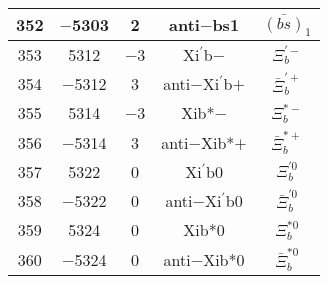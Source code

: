 \documentclass{article}
\begin{document}
\begin{table}[!htbp]
\begin{tabular}{|c|c|c|c|c|}
\hline
352 & $-$5303 & 2 & anti$-$bs\underline{\hspace{0.6em}}1 & $\bar{(bs)}_{1}$ \\
\hline
353 & 5312 & $-$3 & Xi$^{\prime}$\underline{\hspace{0.6em}}b$-$ & $\Xi_{b}^{\prime-}$ \\
\hline
354 & $-$5312 & 3 & anti$-$Xi$^{\prime}$\underline{\hspace{0.6em}}b$+$ & $\bar{\Xi}_{b}^{\prime+}$ \\
\hline
355 & 5314 & $-$3 & Xi\underline{\hspace{0.6em}}b*$-$ & $\Xi_{b}^{*-}$ \\
\hline
356 & $-$5314 & 3 & anti$-$Xi\underline{\hspace{0.6em}}b*$+$ & $\bar{\Xi}_{b}^{*+}$ \\
\hline
357 & 5322 & 0 & Xi$^{\prime}$\underline{\hspace{0.6em}}b0 & $\Xi_{b}^{\prime0}$ \\
\hline
358 & $-$5322 & 0 & anti$-$Xi$^{\prime}$\underline{\hspace{0.6em}}b0 & $\bar{\Xi}_{b}^{\prime0}$ \\
\hline
359 & 5324 & 0 & Xi\underline{\hspace{0.6em}}b*0 & $\Xi_{b}^{*0}$ \\
\hline
360 & $-$5324 & 0 & anti$-$Xi\underline{\hspace{0.6em}}b*0 & $\bar{\Xi}_{b}^{*0}$ \\
\hline
\end{tabular}
\end{table}

\clearpage
\end{document}
